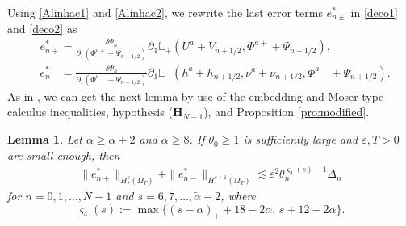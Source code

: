 \documentclass[twoside,11pt]{article}
\numberwithin{equation}{section}
\newtheorem{lemma}{Lemma}[section]
\def\p{\partial}
\begin{document}
Using \eqref{Alinhac1} and \eqref{Alinhac2}, we rewrite the last error terms $e_{{n}\pm}^{*}$ in \eqref{deco1} and \eqref{deco2} as
\begin{align*}
	&e_{{n}+}^{*}=\frac{\delta \Psi_{{n}}
	}{\p_1(\Phi^{a+}+\Psi_{n+1/2} )}\p_1\mathbb{L}_{+}(U^{a}+V_{n+1/2},\Phi^{a+}+\Psi_{n+1/2}) ,\\[1mm]
	&e_{{n}-}^{*}=\frac{\delta \Psi_{{n}}
	}{\p_1(\Phi^{a-}+\Psi_{n+1/2} )} \p_1\mathbb{L}_{-}(h^{a}+h_{n+1/2},\nu^{a}+\nu_{n+1/2},\Phi^{a-}+\Psi_{n+1/2}).
\end{align*}
As in \cite[Lemma 4.10]{TW21MR4201624},
we can get the next lemma by use of the embedding and Moser-type calculus inequalities,
hypothesis ($\mathbf{H}_{N-1}$), and Proposition \ref{pro:modified}.
\begin{lemma}\label{lem:last}
	Let $\widetilde{\alpha}\geq {\alpha }+2$ and ${\alpha }\geq 8$.
	If $\theta_0\geq 1$ is sufficiently  large and $\varepsilon,T>0$ are small enough, then	
	\begin{align} \nonumber %
		\|e_{n+}^*\|_{H_*^s(\Omega_{T})}+\|e_{n-}^*\|_{H^{s+1}(\Omega_{T})}
		\lesssim \varepsilon^2 \theta_n^{\varsigma_4 (s)-1}\varDelta_n
	\end{align}
	for $n=0,1, \ldots,N-1$  and $s=6,7,\ldots,\widetilde{\alpha}-2 $,
	where $$ \varsigma_4(s):=\max\{(s-{\alpha })_++18-2{\alpha },\, s+12-2{\alpha }\}.$$
\end{lemma}
\end{document}
